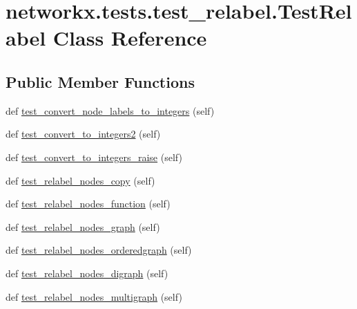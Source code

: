 \hypertarget{classnetworkx_1_1tests_1_1test__relabel_1_1TestRelabel}{}\section{networkx.\+tests.\+test\+\_\+relabel.\+Test\+Relabel Class Reference}
\label{classnetworkx_1_1tests_1_1test__relabel_1_1TestRelabel}
\subsection*{Public Member Functions}
\begin{DoxyCompactItemize}
\item 
def \hyperlink{classnetworkx_1_1tests_1_1test__relabel_1_1TestRelabel_ad8dbc254e98111a07571afbaf9e6751e}{test\+\_\+convert\+\_\+node\+\_\+labels\+\_\+to\+\_\+integers} (self)
\item 
def \hyperlink{classnetworkx_1_1tests_1_1test__relabel_1_1TestRelabel_afd12cd4d3c3be98603735b65c9f3b295}{test\+\_\+convert\+\_\+to\+\_\+integers2} (self)
\item 
def \hyperlink{classnetworkx_1_1tests_1_1test__relabel_1_1TestRelabel_a157bc074bab39f699775c177d313b090}{test\+\_\+convert\+\_\+to\+\_\+integers\+\_\+raise} (self)
\item 
def \hyperlink{classnetworkx_1_1tests_1_1test__relabel_1_1TestRelabel_a908cf846e57974d3c8171e03eafcb059}{test\+\_\+relabel\+\_\+nodes\+\_\+copy} (self)
\item 
def \hyperlink{classnetworkx_1_1tests_1_1test__relabel_1_1TestRelabel_a7dc25737c3a26ed25004b0d41edf191c}{test\+\_\+relabel\+\_\+nodes\+\_\+function} (self)
\item 
def \hyperlink{classnetworkx_1_1tests_1_1test__relabel_1_1TestRelabel_a82737add405bd2a0153864025a24082a}{test\+\_\+relabel\+\_\+nodes\+\_\+graph} (self)
\item 
def \hyperlink{classnetworkx_1_1tests_1_1test__relabel_1_1TestRelabel_add21a87a078ebb94d500ee1959b4a1d1}{test\+\_\+relabel\+\_\+nodes\+\_\+orderedgraph} (self)
\item 
def \hyperlink{classnetworkx_1_1tests_1_1test__relabel_1_1TestRelabel_a2a74f62d03882f01b1f517436f7ee2fc}{test\+\_\+relabel\+\_\+nodes\+\_\+digraph} (self)
\item 
def \hyperlink{classnetworkx_1_1tests_1_1test__relabel_1_1TestRelabel_acf7f5387ffdbbf612989d1f98340957d}{test\+\_\+relabel\+\_\+nodes\+\_\+multigraph} (self)

\end{DoxyCompactItemize}
